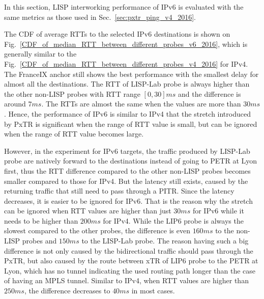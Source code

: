 In this section, LISP interworking performance of IPv6 is evaluated with the same metrics as those used in Sec.~\ref{sec:pxtr_ping_v4_2016}.

The CDF of average RTTs to the selected IPv6 destinations is shown on Fig.~\ref{CDF_of_median_RTT_between_different_probes_v6_2016}, which is generally similar to the Fig.~\ref{CDF_of_median_RTT_between_different_probes_v4_2016} for IPv4. The FranceIX anchor still shows the best performance with the smallest delay for almost all the destinations. The RTT of LISP-Lab probe is always higher than the other non-LISP probes with RTT range $[0, 30]ms$ and the difference is around $7 ms$. The RTTs are almost the same when the values are more than $30 ms$. Hence, the performance of IPv6 is similar to IPv4 that the stretch introduced by PxTR is significant when the range of RTT value is small, but can be ignored when the range of RTT value becomes large. 

However, in the experiment for IPv6 targets, the traffic produced by LISP-Lab probe are natively forward to the destinations instead of going to PETR at Lyon first, thus the RTT difference compared to the other non-LISP probes becomes smaller compared to those for IPv4. But the latency still exists, caused by the returning traffic that still need to pass through a PITR. Since the latency decreases, it is easier to be ignored for IPv6. That is the reason why the stretch can be ignored when RTT values are higher than just $30ms$ for IPv6 while it needs to be higher than $200ms$ for IPv4. While the LIP6 probe is always the slowest compared to the other probes, the difference is even $160ms$ to the non-LISP probes and $150ms$ to the LISP-Lab probe. The reason having such a big difference is not only caused by the bidirectional traffic should pass through the PxTR, but also caused by the route between xTR of LIP6 probe to the PETR at Lyon, which has no tunnel indicating the used routing path longer than the case of having an MPLS tunnel. Similar to IPv4, when RTT values are higher than $250ms$, the difference decreases to $40ms$ in most cases.

